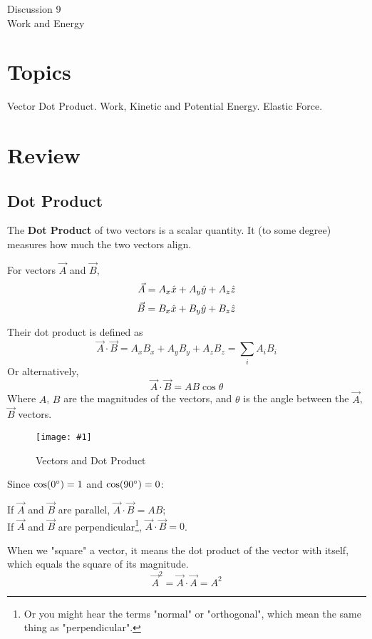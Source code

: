 \documentclass[11pt]{article}
\newcommand{\fig}[4]{
    \begin{figure}[H]
        \centering
        \texttt{[image: \#1]}
        \caption{#2}
        \label{exp4fit}
    \end{figure}
}
\theoremstyle{gangnamstyle}{\newtheorem{definition}{Definition}[]}
\theoremstyle{gangnamstyle}{\newtheorem{example}{Example}[]}
\theoremstyle{gangnamstyle}{\newtheorem{problem}{Problem}[]}
\begin{document}
\normalfont
\pagestyle{pages}


\begin{center}
\vspace{3in}
{\Large Discussion 9 } \\ [0.05in]
Work and Energy \\ [-0.5in]
\end{center}

\section*{Topics}
Vector Dot Product. Work, Kinetic and Potential Energy. Elastic Force. 

\section{Review}

\subsection{Dot Product}

The \textbf{Dot Product} of two vectors is a scalar quantity. It (to some degree) measures how much the two vectors align. 

For vectors $\Vec{A}$ and $\Vec{B}$, 
\[ \Vec{A} = A_x\Hat{x} + A_y\Hat{y} + A_z\Hat{z} \]
\[ \Vec{B} = B_x\Hat{x} + B_y\Hat{y} + B_z\Hat{z} \]

Their dot product is defined as
\[ \Vec{A} \cdot \Vec{B} = A_xB_x + A_yB_y + A_zB_z = \sum_i A_iB_i \]
Or alternatively, 
\[ \Vec{A} \cdot \Vec{B} = AB \cos\theta \]
Where $A$, $B$ are the magnitudes of the vectors, and $\theta$ is the angle between the $\Vec{A}$, $\Vec{B}$ vectors. 

\fig{figs/0711/dot.png}{Vectors and Dot Product}{0.35}{0} 

Since $\cos(0\degree) = 1$ and $\cos(90\degree) = 0$: 

If $\Vec{A}$ and $\Vec{B}$ are parallel, $\Vec{A} \cdot \Vec{B} = AB$; \\
If $\Vec{A}$ and $\Vec{B}$ are perpendicular\footnote{Or you might hear the terms "normal" or "orthogonal", which mean the same thing as "perpendicular".}, $\Vec{A} \cdot \Vec{B} = 0$.

When we "square" a vector, it means the dot product of the vector with itself, which equals the square of its magnitude.
\[ \Vec{A}^2 = \Vec{A} \cdot \Vec{A} = A^2 \]
\end{document}
